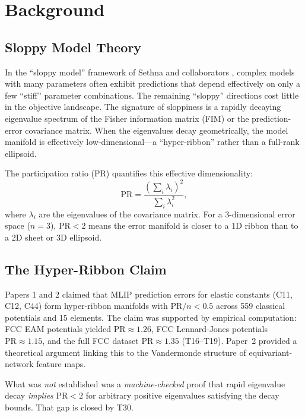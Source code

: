 \documentclass[11pt,a4paper]{article}
\theoremstyle{definition}
\theoremstyle{plain}
\begin{document}
\section{Background}
\label{sec:background}

\subsection{Sloppy Model Theory}
\label{subsec:sloppy}

In the ``sloppy model'' framework of Sethna and collaborators \cite{sethna2007sloppy, transtrum2015perspective}, complex models with many parameters often exhibit predictions that depend effectively on only a few ``stiff'' parameter combinations. The remaining ``sloppy'' directions cost little in the objective landscape. The signature of sloppiness is a rapidly decaying eigenvalue spectrum of the Fisher information matrix (FIM) or the prediction-error covariance matrix. When the eigenvalues decay geometrically, the model manifold is effectively low-dimensional---a ``hyper-ribbon'' rather than a full-rank ellipsoid.

The participation ratio (PR) quantifies this effective dimensionality:
\begin{equation}
\mathrm{PR} = \frac{(\sum_i \lambda_i)^2}{\sum_i \lambda_i^2},
\label{eq:pr}
\end{equation}
where $\lambda_i$ are the eigenvalues of the covariance matrix. For a 3-dimensional error space ($n=3$), $\mathrm{PR} < 2$ means the error manifold is closer to a 1D ribbon than to a 2D sheet or 3D ellipsoid.

\subsection{The Hyper-Ribbon Claim}
\label{subsec:claim}

Papers 1 and 2 claimed that MLIP prediction errors for elastic constants (C11, C12, C44) form hyper-ribbon manifolds with $\mathrm{PR}/n < 0.5$ across 559 classical potentials and 15 elements. The claim was supported by empirical computation: FCC EAM potentials yielded $\mathrm{PR} \approx 1.26$, FCC Lennard-Jones potentials $\mathrm{PR} \approx 1.15$, and the full FCC dataset $\mathrm{PR} \approx 1.35$ (T16--T19). Paper~2 provided a theoretical argument linking this to the Vandermonde structure of equivariant-network feature maps.

What was \emph{not} established was a \emph{machine-checked} proof that rapid eigenvalue decay \emph{implies} $\mathrm{PR} < 2$ for arbitrary positive eigenvalues satisfying the decay bounds. That gap is closed by T30.
\end{document}
